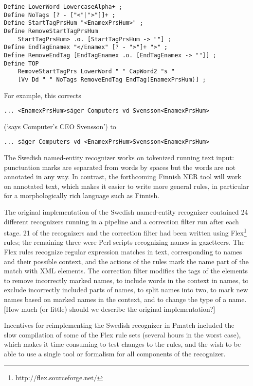 \documentclass{llncs}
\begin{document}
\begin{verbatim}
Define LowerWord LowercaseAlpha+ ;
Define NoTags [? - ["<"|">"]]+ ;
Define StartTagPrsHum "<EnamexPrsHum>" ;
Define RemoveStartTagPrsHum
    StartTagPrsHum> .o. [StartTagPrsHum -> ""] ;
Define EndTagEnamex "</Enamex" [? - ">"]+ ">" ;
Define RemoveEndTag [EndTagEnamex .o. [EndTagEnamex -> ""]] ;
Define TOP
    RemoveStartTagPrs LowerWord " " CapWord2 "s "
    [Vv Dd " " NoTags RemoveEndTag EndTag(EnamexPrsHum)] ;
\end{verbatim}

For example, this corrects

\begin{verbatim}
... <EnamexPrsHum>säger Computers vd Svensson<EnamexPrsHum>
\end{verbatim}

\noindent
(`says Computer's CEO Svensson') to

\begin{verbatim}
... säger Computers vd <EnamexPrsHum>Svensson<EnamexPrsHum>
\end{verbatim}

The Swedish named-entity recognizer works on tokenized running text
input: punctuation marks are separated from words by spaces but the
words are not annotated in any way. In contrast, the forthcoming
Finnish NER tool will work on annotated text, which makes it easier to
write more general rules, in particular for a morphologically rich
language such as Finnish.

The original implementation of the Swedish named-entity recognizer
\cite{kokkinakis/2003} contained 24 different recognizers running in a
pipeline and a correction filter run after each stage. 21 of the
recognizers and the correction filter had been written using
Flex\footnote{http://flex.sourceforge.net/} rules; the remaining three
were Perl scripts recognizing names in gazetteers. The Flex rules
recognize regular expression matches in text, corresponding to names
and their possible context, and the actions of the rules mark the name
part of the match with XML elements. The correction filter modifies
the tags of the elements to remove incorrectly marked names, to
include words in the context in names, to exclude incorrectly included
parts of names, to split names into two, to mark new names based on
marked names in the context, and to change the type of a name.
\textsf{[How much (or little) should we describe the original
    implementation?]}

Incentives for reimplementing the Swedish recognizer in Pmatch
included the slow compilation of some of the Flex rule sets (several
hours in the worst case), which makes it time-consuming to test
changes to the rules, and the wish to be able to use a single tool or
formalism for all components of the recognizer.
\end{document}
